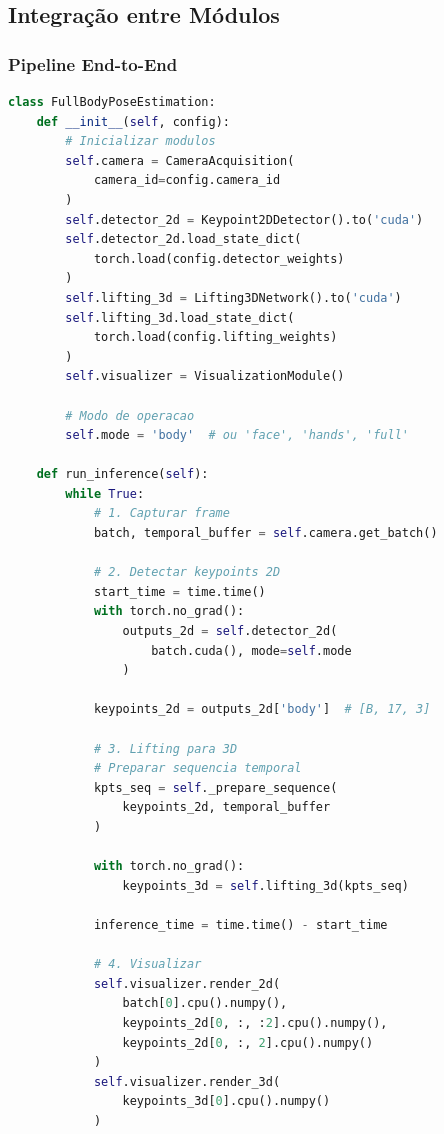 \documentclass[12pt, a4paper]{article}
\begin{document}
\subsection{Integração entre Módulos}

\subsubsection{Pipeline End-to-End}

\begin{lstlisting}[language=Python, caption=Pipeline Completo]
class FullBodyPoseEstimation:
    def __init__(self, config):
        # Inicializar modulos
        self.camera = CameraAcquisition(
            camera_id=config.camera_id
        )
        self.detector_2d = Keypoint2DDetector().to('cuda')
        self.detector_2d.load_state_dict(
            torch.load(config.detector_weights)
        )
        self.lifting_3d = Lifting3DNetwork().to('cuda')
        self.lifting_3d.load_state_dict(
            torch.load(config.lifting_weights)
        )
        self.visualizer = VisualizationModule()
        
        # Modo de operacao
        self.mode = 'body'  # ou 'face', 'hands', 'full'
        
    def run_inference(self):
        while True:
            # 1. Capturar frame
            batch, temporal_buffer = self.camera.get_batch()
            
            # 2. Detectar keypoints 2D
            start_time = time.time()
            with torch.no_grad():
                outputs_2d = self.detector_2d(
                    batch.cuda(), mode=self.mode
                )
            
            keypoints_2d = outputs_2d['body']  # [B, 17, 3]
            
            # 3. Lifting para 3D
            # Preparar sequencia temporal
            kpts_seq = self._prepare_sequence(
                keypoints_2d, temporal_buffer
            )
            
            with torch.no_grad():
                keypoints_3d = self.lifting_3d(kpts_seq)
            
            inference_time = time.time() - start_time
            
            # 4. Visualizar
            self.visualizer.render_2d(
                batch[0].cpu().numpy(),
                keypoints_2d[0, :, :2].cpu().numpy(),
                keypoints_2d[0, :, 2].cpu().numpy()
            )
            self.visualizer.render_3d(
                keypoints_3d[0].cpu().numpy()
            )
            

\end{lstlisting}
\end{document}
